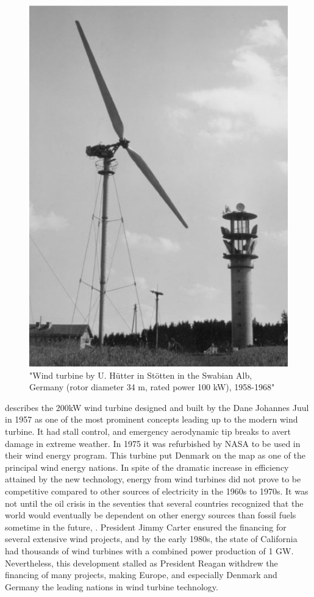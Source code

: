 \begin{figure}[H]
\centering
\includegraphics[scale=0.6]{figures/hutter}
\caption[$\; \:$Hûtter Wind Turbine Concept]{"Wind turbine by U. Hütter in Stötten in the Swabian Alb, Germany (rotor diameter 34 m, rated power 100 kW), 1958-1968" \cite{Hau2013} }
 \label{fig:hutter}
\end{figure}

\noindent \cite{Lynn2011} describes the 200kW wind turbine designed and built by the Dane Johannes Juul in 1957 as one of the most prominent concepts leading up to the modern wind turbine. It had stall control, and emergency aerodynamic tip breaks to avert damage in extreme weather. In 1975 it was refurbished by NASA to be used in their wind energy program. This turbine put Denmark on the map as one of the principal wind energy nations. 
\newline 
\newline
\noindent In spite of the dramatic increase in efficiency attained by the new technology, energy from wind turbines did not prove to be competitive compared to other sources of electricity in the 1960s to 1970s. It was not until the oil crisis in the seventies that several countries recognized that the world would eventually be dependent on other energy sources than fossil fuels sometime in the future, \cite{Wagner2013}.  President Jimmy Carter ensured the financing for several extensive wind projects, and by the early 1980s, the state of California had thousands of wind turbines with a combined power production of 1 GW. Nevertheless, this development stalled as President Reagan withdrew the financing of many projects, making Europe, and especially Denmark and Germany the leading nations in wind turbine technology. 
\cite{Lynn2011}

